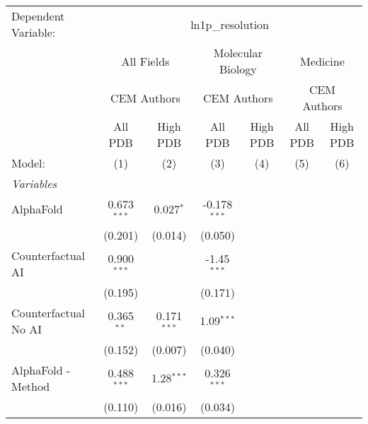 \begingroup
\centering
\begin{tabular}{lcccccc}
   \tabularnewline \midrule \midrule
   Dependent Variable: & \multicolumn{6}{c}{ln1p\_resolution}\\
 & \multicolumn{2}{c}{All Fields} & \multicolumn{2}{c}{Molecular Biology} & \multicolumn{2}{c}{Medicine} \\
\cmidrule(lr){2-3} \cmidrule(lr){4-5} \cmidrule(lr){6-7}
 & \multicolumn{2}{c}{CEM Authors} & \multicolumn{2}{c}{CEM Authors} & \multicolumn{2}{c}{CEM Authors} \\
\cmidrule(lr){2-3} \cmidrule(lr){4-5} \cmidrule(lr){6-7}
 & \multicolumn{1}{c}{All PDB} & \multicolumn{1}{c}{High PDB} & \multicolumn{1}{c}{All PDB} & \multicolumn{1}{c}{High PDB} & \multicolumn{1}{c}{All PDB} & \multicolumn{1}{c}{High PDB} \\
\cmidrule(lr){2-2} \cmidrule(lr){3-3} \cmidrule(lr){4-4} \cmidrule(lr){5-5} \cmidrule(lr){6-6} \cmidrule(lr){7-7}
   Model:                                                     & (1)           & (2)           & (3)            & (4) & (5) & (6)\\  
   \midrule
   \emph{Variables}\\
   AlphaFold                                                  & 0.673$^{***}$ & 0.027$^{*}$   & -0.178$^{***}$ &     &     &   \\   
                                                              & (0.201)       & (0.014)       & (0.050)        &     &     &   \\   
   Counterfactual AI                                          & 0.900$^{***}$ &               & -1.45$^{***}$  &     &     &   \\   
                                                              & (0.195)       &               & (0.171)        &     &     &   \\   
   Counterfactual No AI                                       & 0.365$^{**}$  & 0.171$^{***}$ & 1.09$^{***}$   &     &     &   \\   
                                                              & (0.152)       & (0.007)       & (0.040)        &     &     &   \\   
   AlphaFold - Method                                         & 0.488$^{***}$ & 1.28$^{***}$  & 0.326$^{***}$  &     &     &   \\   
                                                              & (0.110)       & (0.016)       & (0.034)        &     &     &   \\   

\end{tabular}
